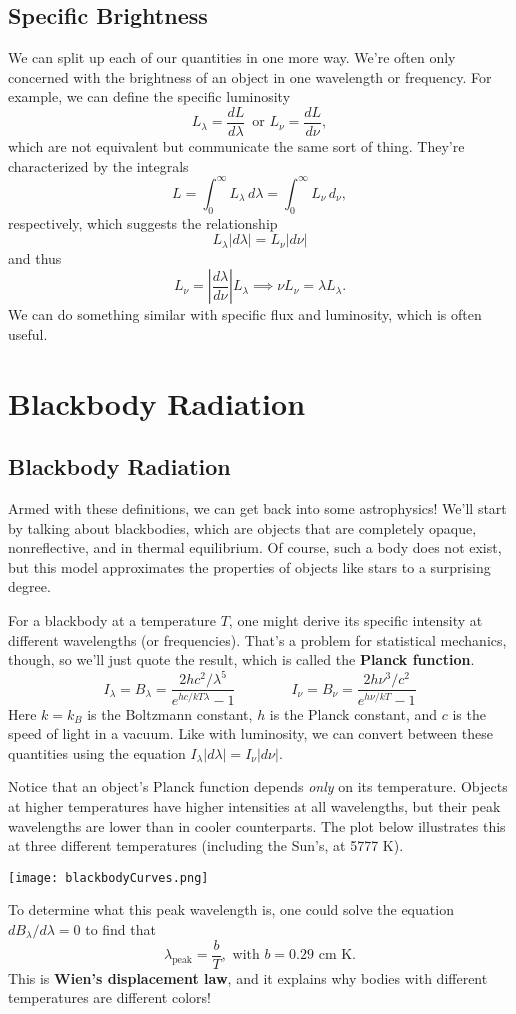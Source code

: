 \documentclass[../a062main.tex]{subfiles}
\begin{document}
\subsection*{Specific Brightness}
We can split up each of our quantities in one more way.
We're often only concerned with the brightness of an object in one wavelength or frequency.
For example, we can define the specific luminosity
\[ L_\lambda = \frac{dL}{d\lambda} \,\text{ or } L_\nu = \frac{dL}{d\nu}, \]
which are not equivalent but communicate the same sort of thing.
They're characterized by the integrals
\[ L = \int_{0}^{\infty} L_\lambda \,d\lambda = \int_{0}^{\infty} L_\nu \,d_\nu, \]
respectively, which suggests the relationship
\[ L_\lambda |d\lambda| = L_\nu |d\nu| \]
and thus
\[ \boxed{L_\nu = \left| \frac{d\lambda}{d\nu} \right| L_\lambda} \implies \boxed{\nu L_\nu = \lambda L_\lambda}. \]
We can do something similar with specific flux and luminosity, which is often useful.

\section{Blackbody Radiation}
\subsection*{Blackbody Radiation}
Armed with these definitions, we can get back into some astrophysics!
We'll start by talking about blackbodies, which are objects that are completely opaque, nonreflective, and in thermal equilibrium.
Of course, such a body does not exist, but this model approximates the properties of objects like stars to a surprising degree.

For a blackbody at a temperature $T$, one might derive its specific intensity at different wavelengths (or frequencies).
That's a problem for statistical mechanics, though, so we'll just quote the result, which is called the \textbf{Planck function}.
\[ \boxed{I_\lambda = B_\lambda = \frac{2hc^2 / \lambda^{5}}{e^{hc / kT\lambda} - 1} \qquad\qquad I_\nu= B_\nu = \frac{2h\nu^3 / c^2}{e^{h\nu / kT} - 1}} \]
Here $k = k_B$ is the Boltzmann constant, $h$ is the Planck constant, and $c$ is the speed of light in a vacuum.
Like with luminosity, we can convert between these quantities using the equation $I_\lambda |d\lambda| = I_\nu |d\nu|$.

Notice that an object's Planck function depends \textit{only} on its temperature.
Objects at higher temperatures have higher intensities at all wavelengths, but their peak wavelengths are lower than in cooler counterparts.
The plot below illustrates this at three different temperatures (including the Sun's, at 5777 K).
\begin{center}
    \texttt{[image: blackbodyCurves.png]}
\end{center}
To determine what this peak wavelength is, one could solve the equation $dB_\lambda / d\lambda = 0$ to find that
\[ \boxed{\lambda_\textrm{peak} = \frac{b}{T}}, \text{ with $b = 0.29 \textrm{ cm K}$.} \]
This is \textbf{Wien's displacement law}, and it explains why bodies with different temperatures are different colors!
\end{document}
